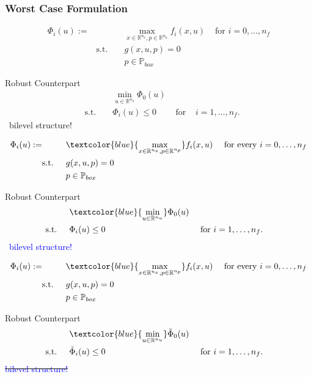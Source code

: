 \begin{frame}
\frametitle{Worst Case Formulation}
\begin{overprint}

\begin{align*}
\Phi_{i}(u):= &&& \max_{x\in \mathbb{R}^{n_{x}}, p\in \mathbb{R}^{n_{p}}} f_{i}(x,u) & \text{ for  } i=0,\ldots,n_{f}\\
& \text{s.t. } && g(x,u,p)=0\\
&&& p\in\mathbb{P}_{box}
\end{align*}

\begin{block}{Robust Counterpart}
\begin{align*}
&&&\min_{u\in\mathbb{R}^{n_{u}}} \Phi_{0}(u)\\
&\text{s.t. } &&\Phi_{i}(u)\leq 0 & \text{ for } & i=1,\ldots,n_{f}.
\end{align*}
\MVRightarrow \ bilevel structure!
\end{block}

\begin{align*}
\Phi_{i}(u):= &&& \textcolor{blue}{\max_{x\in \mathbb{R}^{n_{x}}, p\in \mathbb{R}^{n_{p}}}} f_{i}(x,u) &  \text{ for every } i=0,\ldots,n_{f}\\
& \text{s.t. } && g(x,u,p)=0\\
&&& p\in\mathbb{P}_{box}
\end{align*}

\begin{block}{Robust Counterpart}
	\begin{align*}
	&&&\textcolor{blue}{\min_{u\in\mathbb{R}^{n_{u}}}} \Phi_{0}(u)\\
	&\text{s.t. } &&\Phi_{i}(u)\leq 0 & \text{ for } & i=1,\ldots,n_{f}.
	\end{align*}
	\textcolor{blue}{\MVRightarrow \ bilevel structure!}
\end{block}

\begin{align*}
\Phi_{i}(u):= &&& \textcolor{blue}{\max_{x\in \mathbb{R}^{n_{x}}, p\in \mathbb{R}^{n_{p}}}} f_{i}(x,u) &  \text{ for every } i=0,\ldots,n_{f}\\
& \text{s.t. } && g(x,u,p)=0\\
&&& p\in\mathbb{P}_{box}
\end{align*}

\begin{block}{Robust Counterpart}
	\begin{align*}
	&&&\textcolor{blue}{\min_{u\in\mathbb{R}^{n_{u}}}} \tilde{\Phi}_{0}(u)\\
	&\text{s.t. } &&\tilde{\Phi}_{i}(u)\leq 0 & \text{ for } & i=1,\ldots,n_{f}.
	\end{align*}
	\sout{{\textcolor{blue}{\MVRightarrow {} bilevel structure!}}}
\end{block}

\end{overprint}

\end{frame}

